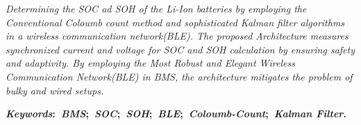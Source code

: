 \thispagestyle{empty} 

\noindent \textit{
    Determining the SOC ad SOH of the Li-Ion batteries by employing the Conventional Coloumb count method and sophisticated Kalman filter algorithms in a wireless communication network(BLE). 
    The proposed Architecture measures synchronized current and voltage for SOC and SOH calculation by ensuring safety and adaptivity. 
    By employing the Most Robust and Elegant Wireless Communication Network(BLE) in BMS, the architecture mitigates the problem of bulky and wired setups.
}




\vspace{5mm}
\noindent\textbf{\textit{Keywords}:~\textit{BMS};~\textit{SOC};~\textit{SOH};~\textit{BLE};~\textit{Coloumb-Count};~\textit{Kalman Filter}.}
